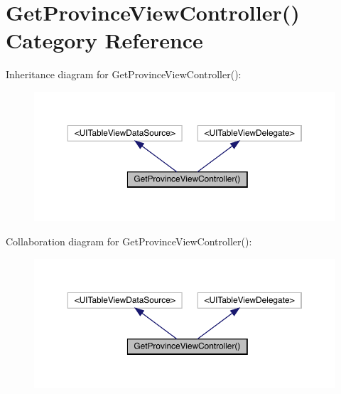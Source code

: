 \hypertarget{category_get_province_view_controller_07_08}{}\section{Get\+Province\+View\+Controller() Category Reference}
\label{category_get_province_view_controller_07_08}


Inheritance diagram for Get\+Province\+View\+Controller()\+:\nopagebreak
\begin{figure}[H]
\begin{center}
\leavevmode
\includegraphics[width=350pt]{category_get_province_view_controller_07_08__inherit__graph}
\end{center}
\end{figure}


Collaboration diagram for Get\+Province\+View\+Controller()\+:\nopagebreak
\begin{figure}[H]
\begin{center}
\leavevmode
\includegraphics[width=350pt]{category_get_province_view_controller_07_08__coll__graph}
\end{center}
\end{figure}
